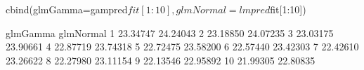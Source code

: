 \begin{Schunk}
\begin{Sinput}
 cbind(glmGamma=gampred$fit[1:10],glmNormal=lmpred$fit[1:10])
\end{Sinput}
\begin{Soutput}
   glmGamma glmNormal
1  23.34747  24.24043
2  23.18850  24.07235
3  23.03175  23.90661
4  22.87719  23.74318
5  22.72475  23.58200
6  22.57440  23.42303
7  22.42610  23.26622
8  22.27980  23.11154
9  22.13546  22.95892
10 21.99305  22.80835
\end{Soutput}
\begin{Sinput}
 
\end{Sinput}
\end{Schunk}
